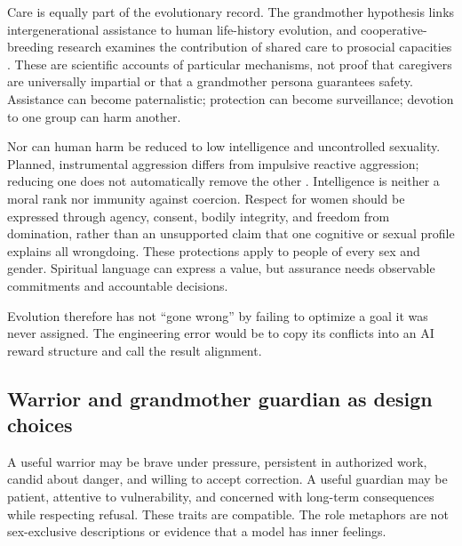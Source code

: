 \documentclass[10pt,twocolumn,letterpaper]{article}
\begin{document}
Care is equally part of the evolutionary record. The grandmother hypothesis links intergenerational assistance to human life-history evolution, and cooperative-breeding research examines the contribution of shared care to prosocial capacities \cite{hawkes,burkart}. These are scientific accounts of particular mechanisms, not proof that caregivers are universally impartial or that a grandmother persona guarantees safety. Assistance can become paternalistic; protection can become surveillance; devotion to one group can harm another.

Nor can human harm be reduced to low intelligence and uncontrolled sexuality. Planned, instrumental aggression differs from impulsive reactive aggression; reducing one does not automatically remove the other \cite{wrangham}. Intelligence is neither a moral rank nor immunity against coercion. Respect for women should be expressed through agency, consent, bodily integrity, and freedom from domination, rather than an unsupported claim that one cognitive or sexual profile explains all wrongdoing. These protections apply to people of every sex and gender. Spiritual language can express a value, but assurance needs observable commitments and accountable decisions.

Evolution therefore has not ``gone wrong'' by failing to optimize a goal it was never assigned. The engineering error would be to copy its conflicts into an AI reward structure and call the result alignment.

\subsection{Warrior and grandmother guardian as design choices}
A useful warrior may be brave under pressure, persistent in authorized work, candid about danger, and willing to accept correction. A useful guardian may be patient, attentive to vulnerability, and concerned with long-term consequences while respecting refusal. These traits are compatible. The role metaphors are not sex-exclusive descriptions or evidence that a model has inner feelings.
\end{document}
